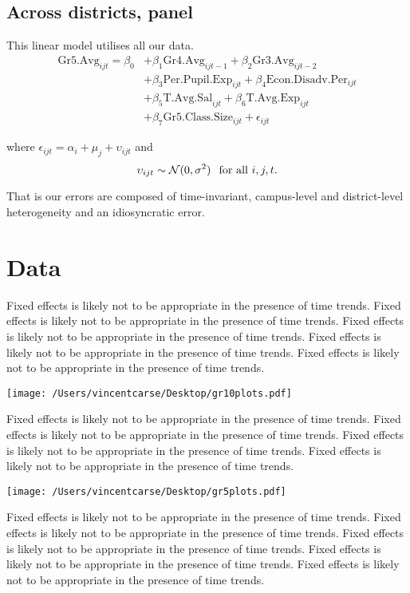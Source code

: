 \documentclass[11pt]{article}
\newcommand{\N}{\mathcal{N}}
\begin{document}
\subsection{Across districts, panel}
\label{ss:nextsub4}

This linear model utilises all our data.
\begin{align*}
\mathrm{Gr5.Avg}_{ijt} = \beta_{0} 
&+ \beta_{1}  \mathrm{Gr4.Avg}_{ijt-1} 
+ \beta_{2}  \mathrm{Gr3.Avg}_{ijt-2}    \\
&+ \beta_{3}  \mathrm{Per.Pupil.Exp}_{ijt} 
+ \beta_{4}  \mathrm{Econ.Disadv.Per}_{ijt} \\
&+ \beta_{5}  \mathrm{T.Avg.Sal}_{ijt}   
+ \beta_{6}  \mathrm{T.Avg.Exp}_{ijt}  \\
&+ \beta_{7}  \mathrm{Gr5.Class.Size}_{ijt} + \epsilon_{ijt}
\end{align*}

where $\epsilon_{ijt}=\alpha_{i}+\mu_{j}+\upsilon_{ijt}$ and
$$\upsilon_{ijt} \sim \N(0,\sigma^2) \hspace{0.1in} \mbox{for all } i,j,t.$$
  
  That is  our errors are composed of time-invariant, campus-level and district-level heterogeneity and an idiosyncratic error. 

\section{Data}

Fixed effects is likely not to be appropriate in the presence of time trends. 
Fixed effects is likely not to be appropriate in the presence of time trends. 
Fixed effects is likely not to be appropriate in the presence of time trends. 
Fixed effects is likely not to be appropriate in the presence of time trends. 
Fixed effects is likely not to be appropriate in the presence of time trends. 

\texttt{[image: /Users/vincentcarse/Desktop/gr10plots.pdf]}

Fixed effects is likely not to be appropriate in the presence of time trends. 
Fixed effects is likely not to be appropriate in the presence of time trends. 
Fixed effects is likely not to be appropriate in the presence of time trends. 
Fixed effects is likely not to be appropriate in the presence of time trends.

\texttt{[image: /Users/vincentcarse/Desktop/gr5plots.pdf]}

Fixed effects is likely not to be appropriate in the presence of time trends. 
Fixed effects is likely not to be appropriate in the presence of time trends. 
Fixed effects is likely not to be appropriate in the presence of time trends. 
Fixed effects is likely not to be appropriate in the presence of time trends. 
Fixed effects is likely not to be appropriate in the presence of time trends. 
\end{document}
